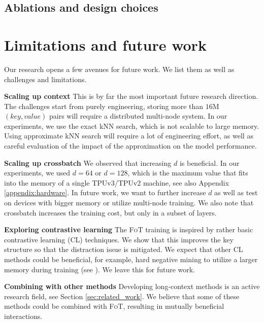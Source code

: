 \subsection{Ablations and design choices}\label{sec:ablations}

\section{Limitations and future work}

 Our research opens a few avenues for future work. We list them as well as challenges and limitations.

\textbf{Scaling up {context}} This is by far the most important future research direction. The challenges start from purely engineering, storing more than $16$M $(key, value)$ pairs will require a distributed multi-node system. In our experiments, we use the exact kNN search, which is not scalable to large memory. Using approximate kNN search will require a lot of engineering effort, as well as careful evaluation of the impact of the approximation on the model performance. 

\textbf{Scaling up crossbatch} We observed that increasing $d$ is beneficial. In our experiments, we used $d=64$ or $d=128$, which is the maximum value that fits into the memory of a single TPUv3/TPUv2 machine, see also Appendix \ref{appendix:hardware}.  
In future work, we want to further increase $d$ as well as test on devices with bigger memory or utilize multi-node training. {We also note that crossbatch increases the training cost, but only in a subset of layers.}

\textbf{Exploring contrastive learning} The \textsc{FoT} training is inspired by rather basic contrastive learning (CL) techniques. We show that this improves the key structure so that the distraction issue is mitigated. We expect that other CL methods could be beneficial, for example, hard negative mining to utilize a larger memory during training (see \citep{lindgren2021efficient}). We leave this for future work.

\textbf{Combining with other methods} Developing long-context methods is an active research field, see Section \ref{sec:related_work}. We believe that some of these methods could be combined with \textsc{FoT}, resulting in mutually beneficial interactions.

